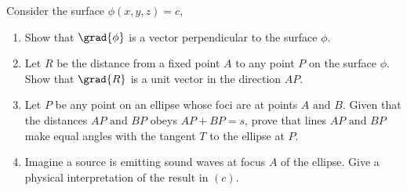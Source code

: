 \documentclass[english,a4paper,12pt]{report}
\begin{document}
{Consider the surface \(\phi (x,y,z) = c\), 

\begin{enumerate}
	\item Show that \(\grad{\phi } \) is a vector perpendicular to the surface \(\phi \).
	\item Let \(R\) be the distance from a fixed point \(A\) to any point \(P\) on the surface \(\phi \). Show that \(\grad{R} \) is a unit vector in the direction \(AP\). 
	\item Let \(P\) be any point on an ellipse whose foci are at points \(A \text { and } B\). Given that the distances \(AP \text { and } BP\) obeys \(AP + BP = s\), prove that lines \(AP \text { and } BP\) make equal angles with the tangent \(T\) to the ellipse at \(P\).       
	\item Imagine a source is emitting sound waves at focus \(A\) of the ellipse. Give a physical interpretation of the result in \((c)\). 
\end{enumerate}
~
}
\end{document}
